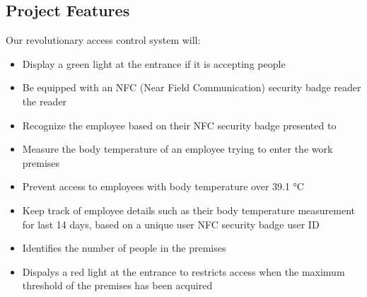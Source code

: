 \subsection{Project Features}

Our revolutionary access control system will:
\begin{itemize}
    \item Display a green light at the entrance if it is accepting people
    \item Be equipped with an NFC (Near Field Communication) security badge
          reader
          the reader 
    \item Recognize the employee based on their NFC security badge presented to
    \item Measure the body temperature of an employee trying to enter the work
          premises 
    \item Prevent access to employees with body temperature over 39.1 °C
    \item Keep track of employee details such as their body temperature
          measurement for last 14 days, based on a unique user NFC security badge
          user ID
    \item Identifies the number of people in the premises 
    \item Dispalys a red light at the entrance to restricts access when the
          maximum threshold of the premises has been acquired
\end{itemize}

